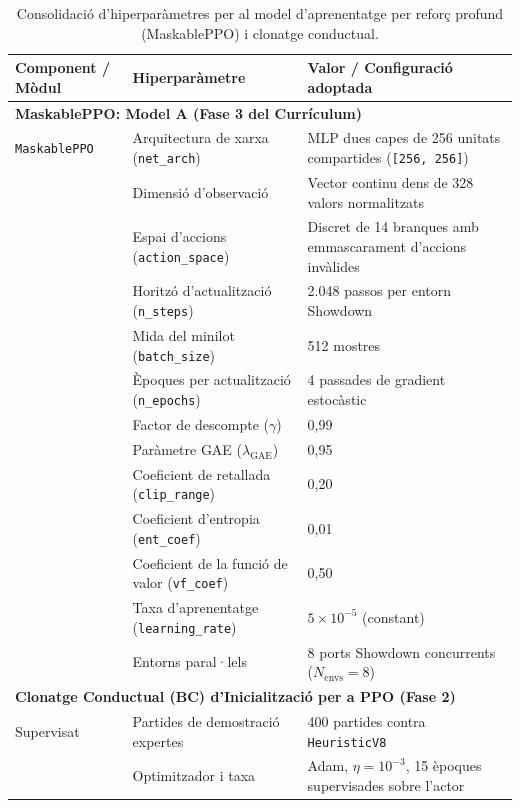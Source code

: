 \begin{table}[htbp]
\centering
\caption{Consolidació d'hiperparàmetres per al model d'aprenentatge per reforç profund (MaskablePPO) i clonatge conductual.}
\label{tab:app_hyperparameters_ppo}
\footnotesize
\renewcommand{\arraystretch}{1.15}
\begin{tabularx}{\textwidth}{l>{\raggedright\arraybackslash}p{3.5cm}X}
\toprule
\textbf{Component / Mòdul} & \textbf{Hiperparàmetre} & \textbf{Valor / Configuració adoptada} \\
\midrule
\multicolumn{3}{l}{\textbf{MaskablePPO: Model A (Fase 3 del Currículum)}} \\
\midrule
\texttt{MaskablePPO} & Arquitectura de xarxa (\texttt{net\_arch}) & MLP dues capes de 256 unitats compartides (\texttt{[256, 256]}) \\
& Dimensió d'observació & Vector continu dens de 328 valors normalitzats \\
& Espai d'accions (\texttt{action\_space}) & Discret de 14 branques amb emmascarament d'accions invàlides \\
& Horitzó d'actualització (\texttt{n\_steps}) & 2.048 passos per entorn Showdown \\
& Mida del minilot (\texttt{batch\_size}) & 512 mostres \\
& Èpoques per actualització (\texttt{n\_epochs}) & 4 passades de gradient estocàstic \\
& Factor de descompte ($\gamma$) & 0,99 \\
& Paràmetre GAE ($\lambda_{\mathrm{GAE}}$) & 0,95 \\
& Coeficient de retallada (\texttt{clip\_range}) & 0,20 \\
& Coeficient d'entropia (\texttt{ent\_coef}) & 0,01 \\
& Coeficient de la funció de valor (\texttt{vf\_coef}) & 0,50 \\
& Taxa d'aprenentatge (\texttt{learning\_rate}) & $5 \times 10^{-5}$ (constant) \\
& Entorns paral·lels & 8 ports Showdown concurrents ($N_{\mathrm{envs}} = 8$) \\
\midrule
\multicolumn{3}{l}{\textbf{Clonatge Conductual (BC) d'Inicialització per a PPO (Fase 2)}} \\
\midrule
Supervisat & Partides de demostració expertes & 400 partides contra \texttt{HeuristicV8} \\
& Optimitzador i taxa & Adam, $\eta = 10^{-3}$, 15 èpoques supervisades sobre l'actor \\
\bottomrule
\end{tabularx}
\end{table}
